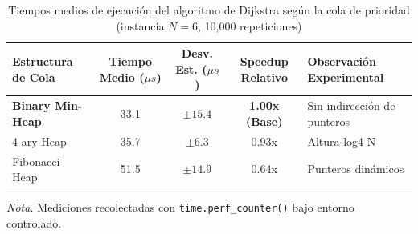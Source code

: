 \begin{table}[H]
    \centering
    \fontsize{10}{12.5}\selectfont
    \caption{Tiempos medios de ejecución del algoritmo de Dijkstra según la cola de prioridad (instancia $N=6$, 10,000 repeticiones)}
    \label{tab:benchmark_preliminar}
    \begin{tabularx}{\textwidth}{p{4.5cm}cccX}
        \toprule
        \textbf{Estructura de Cola} & \textbf{Tiempo Medio ($\mu s$)} & \textbf{Desv. Est. ($\mu s$)} & \textbf{Speedup Relativo} & \textbf{Observación Experimental} \\
        \midrule
        \textbf{Binary Min-Heap} & 33.1 & $\pm 15.4$ & \textbf{1.00x (Base)} & Sin indirección de punteros \\
        4-ary Heap & 35.7 & $\pm 6.3$ & 0.93x & Altura log4 N \\
        Fibonacci Heap & 51.5 & $\pm 14.9$ & 0.64x & Punteros dinámicos \\
        \bottomrule
    \end{tabularx}
    \vspace{0.15cm}
    \raggedright
    \textit{Nota.} Mediciones recolectadas con \texttt{time.perf\_counter()} bajo entorno controlado.
\end{table}
